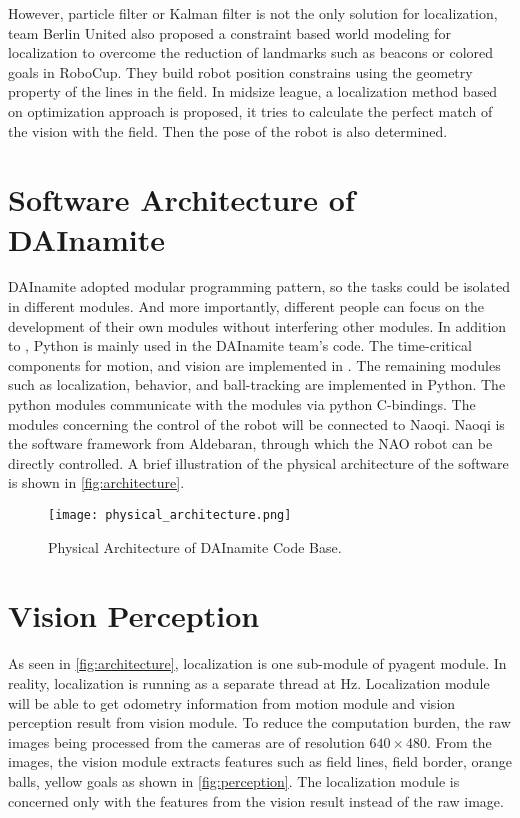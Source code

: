 However, particle filter or Kalman filter is not the only solution for localization, team Berlin United also proposed a constraint based world modeling for localization \cite{Gohring2009} to overcome the reduction of landmarks such as beacons or colored goals in RoboCup. They build robot position constrains using the geometry property of the lines in the field. In midsize league, a localization method based on optimization approach \cite{Lauer2006} is proposed, it tries to calculate the perfect match of the vision with the field. Then the pose of the robot is also determined.



\section{Software Architecture of DAInamite}\label{sec:arch}
DAInamite adopted modular programming pattern, so the tasks could be isolated in different modules. And more importantly, different people can focus on the development of their own modules without interfering other modules. In addition to \cpp{}, Python is mainly used in the DAInamite team's code.
The time-critical components for motion, and vision are implemented in \cpp{}. The remaining modules such as localization, behavior, and ball-tracking are implemented in Python. The python modules communicate with the \cpp{} modules via python C-bindings. The modules concerning the control of the robot will be connected to Naoqi. Naoqi is the software framework from Aldebaran, through which the NAO robot can be directly controlled. A brief illustration of the physical architecture of the software is shown in \autoref{fig:architecture}. 

\begin{figure}[h!]
  \centering
  \texttt{[image: physical\_architecture.png]}
  \caption{Physical Architecture of DAInamite Code Base.}
  \label{fig:architecture}
\end{figure}

\section{Vision Perception}\label{sec:vision}
As seen in \autoref{fig:architecture}, localization is one sub-module of pyagent module. In reality, localization is running as a separate thread at \unit[30]{Hz}. Localization module will be able to get odometry information from motion module and vision perception result from vision module. To reduce the computation burden, the raw images being processed from the cameras are of resolution $640 \times 480$. From the images, the vision module extracts features such as field lines, field border, orange balls, yellow goals as shown in \autoref{fig:perception}. The localization module is concerned only with the features from the vision result instead of the raw image.

